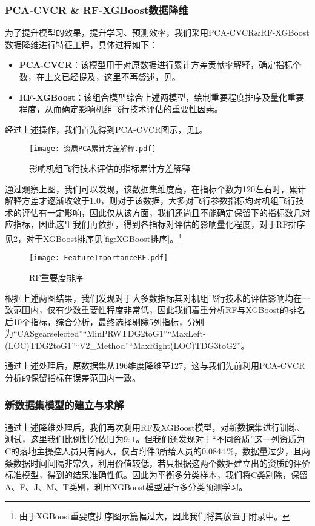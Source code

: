 \documentclass{MathorCupModeling}
\begin{document}
	\subsubsection{PCA-CVCR \& RF-XGBoost数据降维}
	为了提升模型的效果，提升学习、预测效率，我们采用PCA-CVCR\&RF-XGBoost数据降维进行特征工程，具体过程如下：
	\begin{itemize}
		\item \textbf{PCA-CVCR}：该模型用于对原数据进行累计方差贡献率解释，确定指标个数，在上文已经提及，这里不再赘述，见\textcolor{blue}{}。
		\item \textbf{RF-XGBoost}：该组合模型综合上述两模型，绘制重要程度排序及量化重要程度，从而确定影响机组飞行技术评估的重要性因素。
	\end{itemize}
	经过上述操作，我们首先得到PCA-CVCR图示，见\textcolor{blue}{\cref{fig:附件3累计方差解释}}。
	\begin{figure}[H]
		\centering
		\texttt{[image: 资质PCA累计方差解释.pdf]}
		\caption{影响机组飞行技术评估的指标累计方差解释}
		\label{fig:附件3累计方差解释}
	\end{figure}

	通过观察上图，我们可以发现，该数据集维度高，在指标个数为120左右时，累计解释方差才逐渐收敛于1.0，则对于该数据，大多对飞行参数指标均对机组飞行技术的评估有一定影响，因此仅从该方面，我们还尚且不能确定保留下的指标数几对应指标，因此这里我们再依据\textcolor{blue}{}，得到各指标对评估的影响量化程度，对于RF排序见\textcolor{blue}{\cref{fig:RF排序}}，对于XGBoost排序见\textcolor{blue}{\cref{fig:XGBoost排序}}。\textcolor{blue}{\footnote{由于XGBoost重要度排序图示篇幅过大，因此我们将其放置于附录中。}}
	\begin{figure}[H]
		\centering
		\texttt{[image: FeatureImportanceRF.pdf]}
		\caption{RF重要度排序}
		\label{fig:RF排序}
	\end{figure}

	根据上述两图结果，我们发现对于大多数指标其对机组飞行技术的评估影响均在一致范围内，仅有少数重要性程度非常低，因此我们着重分析RF与XGBoost的排名后10个指标，综合分析，最终选择剔除5列指标，分别为“CASgearselected”“MinPRWTDG2toG1”“MaxLeft-\\(LOC)TDG2toG1”“V2\_Method”“MaxRight(LOC)TDG3toG2”。

	通过上述处理后，原数据集从196维度降维至127，这与我们先前利用PCA-CVCR分析的保留指标在误差范围内一致。

	\subsubsection{新数据集模型的建立与求解}
	通过上述降维处理后，我们再次利用RF及XGBoost模型，对新数据集进行训练、测试，这里我们比例划分依旧为$9:1$。但我们还发现对于“不同资质”这一列资质为C的落地主操控人员只有两人，仅占附件3所给人员的$0.0844\,\%$，数据量过少，且两条数据时间间隔非常久，利用价值较低，若只根据这两个数据建立出的资质的评价标准模型，得到的结果准确性低。因此为平衡多分类样本，我们将C类剔除，保留A、F、J、M、T类别，利用XGBoost模型进行多分类预测学习。
\end{document}
